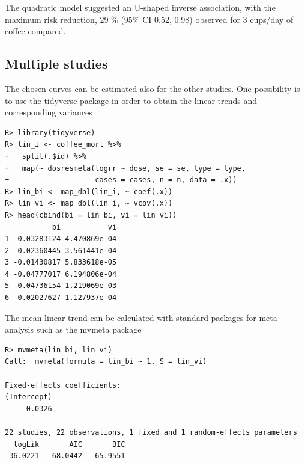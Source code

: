 \documentclass[11pt,a4paper,twoside,openany]{book}\usepackage{knitr}
\newcommand{\pkg}[1]{{\fontseries{b}\selectfont #1}}
\begin{document}
{{The quadratic model suggested an U-shaped inverse association, with the maximum risk reduction, 29 \% (95\% CI 0.52, 0.98) observed for 3 cups/day of coffee compared.

\subsection{Multiple studies}

The chosen curves can be estimated also for the other studies. One possibility is to use the \pkg{tidyverse} package \citep{tidyverse} in order to obtain the linear trends and corresponding variances

\begin{knitrout}\footnotesize
{}\color{fgcolor}\begin{kframe}
\begin{verbatim}
R> library(tidyverse)
R> lin_i <- coffee_mort %>%
+   split(.$id) %>%
+   map(~ dosresmeta(logrr ~ dose, se = se, type = type,
+                    cases = cases, n = n, data = .x))
R> lin_bi <- map_dbl(lin_i, ~ coef(.x))
R> lin_vi <- map_dbl(lin_i, ~ vcov(.x))
R> head(cbind(bi = lin_bi, vi = lin_vi))
           bi           vi
1  0.03283124 4.470869e-04
2 -0.02360445 3.561441e-04
3 -0.01430817 5.833618e-05
4 -0.04777017 6.194806e-04
5 -0.04736154 1.219069e-03
6 -0.02027627 1.127937e-04
\end{verbatim}
\end{kframe}
\end{knitrout}

\noindent The mean linear trend can be calculated with standard packages for meta-analysis such as the \pkg{mvmeta} package \citep{gasparrini2012multivariate}
\begin{knitrout}\footnotesize
{}\color{fgcolor}\begin{kframe}
\begin{verbatim}
R> mvmeta(lin_bi, lin_vi)
Call:  mvmeta(formula = lin_bi ~ 1, S = lin_vi)

Fixed-effects coefficients:
(Intercept)  
    -0.0326  

22 studies, 22 observations, 1 fixed and 1 random-effects parameters
  logLik       AIC       BIC  
 36.0221  -68.0442  -65.9551  
\end{verbatim}
\end{kframe}
\end{knitrout}

}}
\end{document}
